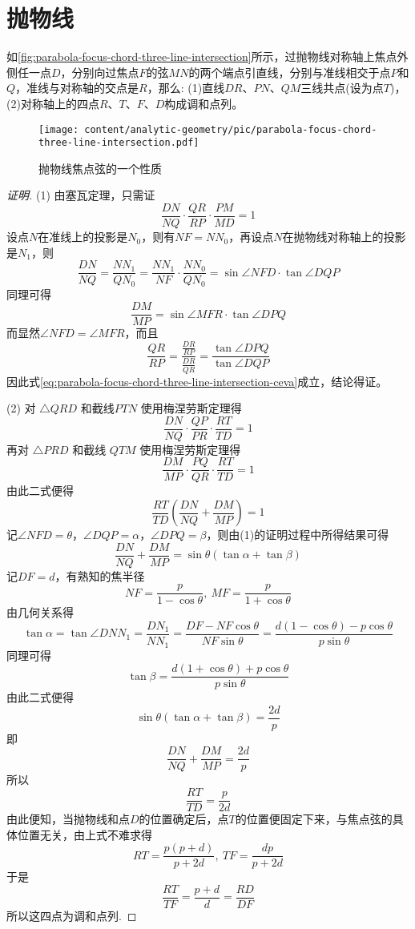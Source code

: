 
\section{抛物线}
\label{sec:para-curve}

\begin{property}
  如\autoref{fig:parabola-focus-chord-three-line-intersection}所示，过抛物线对称轴上焦点外侧任一点$D$，分别向过焦点$F$的弦$MN$的两个端点引直线，分别与准线相交于点$P$和$Q$，准线与对称轴的交点是$R$，那么: (1)直线$DR$、$PN$、$QM$三线共点(设为点$T$)，(2)对称轴上的四点$R$、$T$、$F$、$D$构成调和点列。
\end{property}

\begin{figure}[htbp]
  \centering
\texttt{[image: content/analytic-geometry/pic/parabola-focus-chord-three-line-intersection.pdf]}
\caption{抛物线焦点弦的一个性质}
\label{fig:parabola-focus-chord-three-line-intersection}
\end{figure}

\begin{proof}[证明]
  (1) 由塞瓦定理，只需证
  \begin{equation}
    \label{eq:parabola-focus-chord-three-line-intersection-ceva}
  \frac{DN}{NQ} \cdot \frac{QR}{RP} \cdot \frac{PM}{MD} = 1 
  \end{equation}
  设点$N$在准线上的投影是$N_0$，则有$NF=NN_0$，再设点$N$在抛物线对称轴上的投影是$N_1$，则
  \[ \frac{DN}{NQ} = \frac{NN_1}{QN_0} = \frac{NN_1}{NF} \cdot \frac{NN_0}{QN_0} = \sin{\angle NFD} \cdot \tan{\angle DQP} \]
  同理可得
  \[ \frac{DM}{MP} = \sin{\angle MFR} \cdot \tan{\angle DPQ} \]
  而显然$\angle NFD = \angle MFR$，而且
  \[ \frac{QR}{RP} = \frac{\frac{DR}{RP}}{\frac{DR}{QR}} = \frac{\tan{\angle DPQ}}{\tan{\angle DQP}} \]
  因此式\ref{eq:parabola-focus-chord-three-line-intersection-ceva}成立，结论得证。

  (2) 对 $\triangle QRD$ 和截线$PTN$ 使用梅涅劳斯定理得
  \[ \frac{DN}{NQ} \cdot \frac{QP}{PR} \cdot \frac{RT}{TD} = 1 \]
  再对 $\triangle PRD$ 和截线 $QTM$ 使用梅涅劳斯定理得
  \[ \frac{DM}{MP} \cdot \frac{PQ}{QR} \cdot \frac{RT}{TD} = 1 \]
  由此二式便得
  \[ \frac{RT}{TD} \left( \frac{DN}{NQ} + \frac{DM}{MP} \right) = 1 \]
  记$\angle NFD=\theta$，$\angle DQP=\alpha$，$\angle DPQ=\beta$，则由(1)的证明过程中所得结果可得
  \[ \frac{DN}{NQ} + \frac{DM}{MP} = \sin{\theta} (\tan{\alpha} + \tan{\beta}) \]
  记$DF=d$，有熟知的焦半径
  \[ NF=\frac{p}{1-\cos{\theta}}, \  MF = \frac{p}{1+\cos{\theta}} \]
  由几何关系得
  \[ \tan{\alpha} = \tan{\angle DNN_1} = \frac{DN_1}{NN_1} = \frac{DF-NF\cos{\theta}}{NF \sin{\theta}} = \frac{d(1-\cos{\theta})-p\cos{\theta}}{p\sin{\theta}} \]
  同理可得
  \[ \tan{\beta} = \frac{d(1+\cos{\theta})+p\cos{\theta}}{p\sin{\theta}} \]
  由此二式便得
  \[ \sin{\theta}(\tan{\alpha} + \tan{\beta}) = \frac{2d}{p} \]
  即
  \[ \frac{DN}{NQ} + \frac{DM}{MP} = \frac{2d}{p} \]
  所以
  \[ \frac{RT}{TD} = \frac{p}{2d} \]
  由此便知，当抛物线和点$D$的位置确定后，点$T$的位置便固定下来，与焦点弦的具体位置无关，由上式不难求得
  \[ RT = \frac{p(p+d)}{p+2d}, \  TF=\frac{dp}{p+2d} \]
  于是
  \[ \frac{RT}{TF} = \frac{p+d}{d} = \frac{RD}{DF} \]
  所以这四点为调和点列.
\end{proof}

